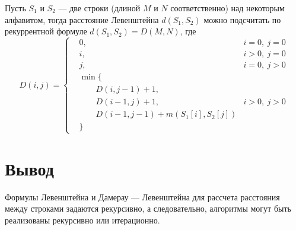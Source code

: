 Пусть $S_{1}$ и $S_{2}$ — две строки (длиной $M$ и $N$ соответственно) над некоторым алфавитом, тогда расстояние Левенштейна $d(S_{1},S_{2})$ можно подсчитать по рекуррентной формуле $d(S_{1},S_{2}) = D(M,N)$, где\\
\begin{equation}
D(i,j) = 
\left \{ \begin{aligned}
& 0, & i = 0, \medspace j = 0\\
& i, & i > 0, \medspace j = 0\\
& j, & i = 0, \medspace j > 0\\
& \min\{ &\\
& \qquad D(i, j - 1) + 1, & \\
& \qquad D(i - 1, j) + 1, & i > 0, \medspace j > 0\\
& \qquad D(i - 1, j - 1) + m(S_{1}[i], S_{2}[j]) &\\
& \} &
\end{aligned} \right. 
\end{equation}


\section*{Вывод}

Формулы Левенштейна и Дамерау — Левенштейна для рассчета расстояния между строками задаются рекурсивно, а следовательно, алгоритмы могут быть реализованы рекурсивно или итерационно.

